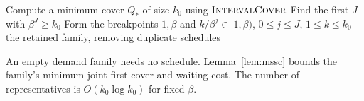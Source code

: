 \begin{algorithm}[H]
\caption{\BatchOrders: deterministic family of geometric-batch schedules}
\label{alg:batch-orders}
Compute a minimum cover $Q_*$ of size $k_0$ using $\textnormal{\textsc{IntervalCover}}$\;
Find the first $J$ with $\beta^J\ge k_0$\;
Form the breakpoints $1,\beta$ and $k/\beta^j\in[1,\beta)$,
$0\le j\le J$, $1\le k\le k_0$\;
\KwRet the retained family, removing duplicate schedules\;
\end{algorithm}

An empty demand family needs no schedule. Lemma~\ref{lem:mssc}
bounds the family's minimum joint first-cover and waiting cost.
The number of representatives is $O(k_0\log k_0)$ for fixed $\beta$.
